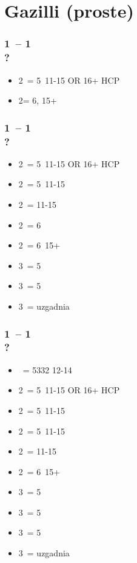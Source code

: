 \documentclass[12pt, a4paper]{report}
\begin{document}
\section*{\colorbox{blue!30}{Gazilli (proste)}}
 {

    \subsubsection*{1\hearts\ -- 1\spades\ \\ ?}
    \begin{itemize}
        \item 2\clubs\ = 5\clubs\ 11-15 OR 16+ HCP \fonce
        \item 2\nt = 6\minor, 15+
    \end{itemize}

    \subsubsection*{1\hearts\ -- 1\ntx\ \\ ?}
    \begin{itemize}
        \item 2\clubs\ = 5\hearts\clubs\ 11-15 OR 16+ HCP \fonce
        \item 2\diams\ = 5\diams\ 11-15
        \item 2\hearts\ = 11-15
        \item 2\spades\ = 6\spades\ \gf
        \item 2\ntx\ = 6\minor\ 15+
        \item 3\clubs\ = 5\clubs\ \gf
        \item 3\diams\ = 5\diams\ \gf
        \item 3\hearts\ = uzgadnia \hearts\ \gf
    \end{itemize}

    \subsubsection*{1\spades\ -- 1\ntx\ \\ ?}
    \begin{itemize}
        \item \pass\ = 5332 12-14
        \item 2\clubs\ = 5\spades\clubs\ 11-15 OR 16+ HCP \fonce
        \item 2\diams\ = 5\diams\ 11-15
        \item 2\hearts\ = 5\hearts\ 11-15
        \item 2\spades\ = 11-15
        \item 2\ntx\ = 6\minor\ 15+
        \item 3\clubs\ = 5\clubs\ \gf
        \item 3\diams\ = 5\diams\ \gf
        \item 3\hearts\ = 5\hearts\ \gf
        \item 3\spades\ = uzgadnia \spades\ \gf
    \end{itemize}

}
\end{document}
